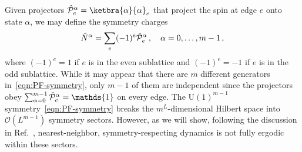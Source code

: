 Given projectors $\hat{\cal{P}}^\alpha_e = \ketbra{\alpha}{\alpha}_e$ that project the spin at edge $e$ onto state $\alpha$, we may define the symmetry charges
%
%
\begin{equation}
\hat{N}^{\alpha} = \sum_e(-1)^e \hat{\cal{P}}_e^\alpha \, ,
\quad \alpha = 0, \dots, m-1 \, , \label{eqn:PF-symmetry}
\end{equation}
%
%
where $(-1)^e=1$ if $e$ is in the even sublattice and $(-1)^e=-1$ if $e$ is in the odd sublattice. While it may appear that there are $m$ different generators in~\eqref{eqn:PF-symmetry}, only $m-1$ of them are independent since the projectors obey $\sum_{\alpha=0}^{m-1} \hat{\cal{P}}_e^\alpha = \mathds{1}$ on every edge. The $\text{U}(1)^{m-1}$ symmetry~\eqref{eqn:PF-symmetry} breaks the $m^L$-dimensional Hilbert space into $\mathcal{O}(L^{m-1})$ symmetry sectors. However, as we will show, following the discussion in Ref.~\cite{Moudgalya2022Commutant}, nearest-neighbor, symmetry-respecting dynamics is not fully ergodic within these sectors.

